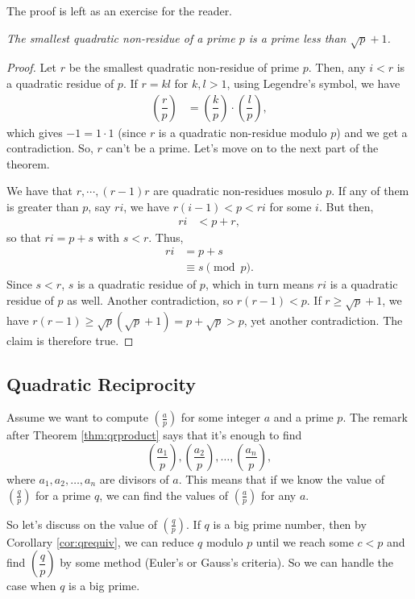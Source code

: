 \documentclass[12pt]{subfile}
\begin{document}
The proof is left as an exercise for the reader.
		\begin{theorem}\slshape
			The smallest quadratic non-residue of a prime $p$ is a prime less than $\sqrt{p}+1$.
		\end{theorem}
		
		\begin{proof}
			Let $r$ be the smallest quadratic non-residue of prime $p$. Then, any $i<r$ is a quadratic residue of $p$. If $r=kl$ for $k,l>1$, using Legendre's symbol, we have
			\begin{align*}
				\left(\dfrac{r}{p}\right) & = \left(\dfrac{k}{p}\right)\cdot\left(\dfrac{l}{p}\right),
			\end{align*}
			which gives $-1=1\cdot 1$ (since $r$ is a quadratic non-residue modulo $p$) and we get a contradiction. So, $r$ can't be a prime. Let's move on to the next part of the theorem.
			
			We have that $r,\cdots,(r-1)r$ are quadratic non-residues mosulo $p$. If any of them is greater than $p$, say $ri$, we have $r(i-1)<p<ri$ for some $i$. But then,
			\begin{align*}
				ri & < p+r,
			\end{align*}
			so that $ri=p+s$ with $s<r$. Thus,
			\begin{align*}
				ri & = p+s\\
				& \equiv s\pmod p.
			\end{align*}
			Since $s<r$, $s$ is a quadratic residue of $p$, which in turn means $ri$ is a quadratic residue of $p$ as well. Another contradiction, so $r(r-1)<p$. If $r\geq\sqrt{p}+1$, we have $r(r-1)\geq\sqrt{p}(\sqrt{p}+1)=p+\sqrt{p}>p$, yet another contradiction. The claim is therefore true.
		\end{proof}
	
	\subsection{Quadratic Reciprocity}
	Assume we want to compute $ \left(\frac{a}{p}\right)$ for some integer $a$ and a prime $p$. The remark after Theorem \ref{thm:qrproduct} says that it's enough to find $$ \left(\dfrac{a_1}{p}\right), \left(\dfrac{a_2}{p}\right), \ldots, \left(\dfrac{a_n}{p}\right),$$ where $a_1,a_2,\ldots,a_n$ are divisors of $a$. This means that if we know the value of $\left(\frac{q}{p}\right)$ for a prime $q$, we can find the values of $\left(\frac{a}{p}\right)$ for any $a$.
	
	So let's discuss on the value of $\left(\frac{q}{p}\right)$. If $q$ is a big prime number, then by Corollary \ref{cor:qrequiv}, we can reduce $q$ modulo $p$ until we reach some $c<p$ and find $\left(\dfrac{q}{p}\right)$ by some method (Euler's or Gauss's criteria). So we can handle the case when $q$ is a big prime.
	
\end{document}
